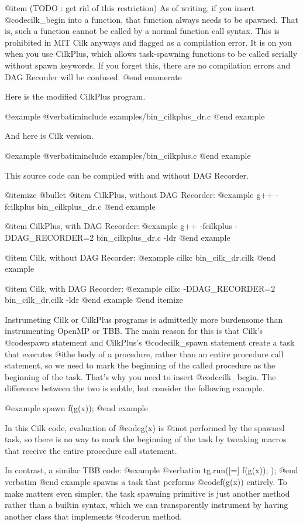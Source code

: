 @item (TODO : get rid of this restriction) As of writing, if you insert @code{cilk_begin}
      into a function, that function always needs to be spawned. That is,
      such a function cannot be called by a normal function call syntax.  
      This is prohibited in MIT Cilk
      anyways and flagged as a compilation error.  It is on you when
      you use CilkPlus, which allows task-spawning functions to be
      called serially without spawn keywords.  If you forget this, there
      are no compilation errors and DAG Recorder will be confused.
@end enumerate

Here is the modified CilkPlus program.

@example
@verbatiminclude examples/bin_cilkplus_dr.c
@end example

And here is Cilk version.

@example
@verbatiminclude examples/bin_cilkplus.c
@end example

This source code can be compiled with and without DAG Recorder.

@itemize @bullet
@item CilkPlus, without DAG Recorder:
@example
g++ -fcilkplus bin_cilkplus_dr.c
@end example

@item CilkPlus, with DAG Recorder:
@example
g++ -fcilkplus -DDAG_RECORDER=2 bin_cilkplus_dr.c -ldr
@end example

@item Cilk, without DAG Recorder:
@example
cilkc bin_cilk_dr.cilk
@end example

@item Cilk, with DAG Recorder:
@example
cilkc -DDAG_RECORDER=2 bin_cilk_dr.cilk -ldr
@end example
@end itemize

Instrumeting Cilk or CilkPlus programs is admittedly more burdensome
than instrumenting OpenMP or TBB.  The main reason for this is that
Cilk's @code{spawn} statement and CilkPlus's @code{cilk_spawn} 
statement create a task
that executes @i{the body of a procedure}, rather than an entire
procedure call statement, so we need to mark the beginning of the called
procedure as the beginning of the task.  That's why you need to insert
@code{cilk_begin}.  The difference between the two is subtle, but
consider the following example.

@example
spawn f(g(x));
@end example

In this Cilk code, evaluation of @code{g(x)} is @i{not} performed by the
spawned task, so there is no way to mark the beginning of the task by
tweaking macros that receive the entire procedure call statement.

In contrast, a similar TBB code:
@example
@verbatim
tg.run([=] { f(g(x)); });
@end verbatim
@end example
spawns a task that performs @code{f(g(x))} entirely.  
To make matters even simpler, the task spawning primitive
is just another method rather than a builtin syntax, 
which we can transparently instrument by having another 
class that implements @code{run} method.



